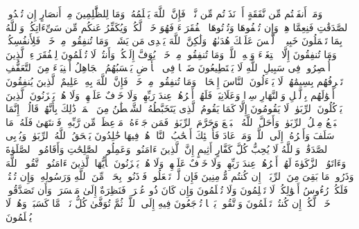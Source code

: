 \stopbuffer
\startbuffer[\q:2:270]
وَمَاۤ أَنفَقۡتُم مِّن نَّفَقَةٍ أَوۡ نَذَرۡتُم مِّن نَّذۡرࣲ فَإِنَّ ٱللَّهَ یَعۡلَمُهُۥۗ وَمَا لِلظَّٰلِمِینَ مِنۡ أَنصَارٍ%
\stopbuffer
\startbuffer[\q:2:271]
إِن تُبۡدُوا۟ ٱلصَّدَقَٰتِ فَنِعِمَّا هِیَۖ وَإِن تُخۡفُوهَا وَتُؤۡتُوهَا ٱلۡفُقَرَاۤءَ فَهُوَ خَیۡرࣱ لَّكُمۡۚ وَیُكَفِّرُ عَنكُم مِّن سَیِّءَاتِكُمۡۗ وَٱللَّهُ بِمَا تَعۡمَلُونَ خَبِیرࣱ%
\stopbuffer
\startbuffer[\q:2:272]
۞ لَّیۡسَ عَلَیۡكَ هُدَىٰهُمۡ وَلَٰكِنَّ ٱللَّهَ یَهۡدِی مَن یَشَاۤءُۗ وَمَا تُنفِقُوا۟ مِنۡ خَیۡرࣲ فَلِأَنفُسِكُمۡۚ وَمَا تُنفِقُونَ إِلَّا ٱبۡتِغَاۤءَ وَجۡهِ ٱللَّهِۚ وَمَا تُنفِقُوا۟ مِنۡ خَیۡرࣲ یُوَفَّ إِلَیۡكُمۡ وَأَنتُمۡ لَا تُظۡلَمُونَ%
\stopbuffer
\startbuffer[\q:2:273]
لِلۡفُقَرَاۤءِ ٱلَّذِینَ أُحۡصِرُوا۟ فِی سَبِیلِ ٱللَّهِ لَا یَسۡتَطِیعُونَ ضَرۡبࣰا فِی ٱلۡأَرۡضِ یَحۡسَبُهُمُ ٱلۡجَاهِلُ أَغۡنِیَاۤءَ مِنَ ٱلتَّعَفُّفِ تَعۡرِفُهُم بِسِیمَٰهُمۡ لَا یَسۡءَلُونَ ٱلنَّاسَ إِلۡحَافࣰاۗ وَمَا تُنفِقُوا۟ مِنۡ خَیۡرࣲ فَإِنَّ ٱللَّهَ بِهِۦ عَلِیمٌ%
\stopbuffer
\startbuffer[\q:2:274]
ٱلَّذِینَ یُنفِقُونَ أَمۡوَٰلَهُم بِٱلَّیۡلِ وَٱلنَّهَارِ سِرࣰّا وَعَلَانِیَةࣰ فَلَهُمۡ أَجۡرُهُمۡ عِندَ رَبِّهِمۡ وَلَا خَوۡفٌ عَلَیۡهِمۡ وَلَا هُمۡ یَحۡزَنُونَ%
\stopbuffer
\startbuffer[\q:2:275]
ٱلَّذِینَ یَأۡكُلُونَ ٱلرِّبَوٰا۟ لَا یَقُومُونَ إِلَّا كَمَا یَقُومُ ٱلَّذِی یَتَخَبَّطُهُ ٱلشَّیۡطَٰنُ مِنَ ٱلۡمَسِّۚ ذَٰلِكَ بِأَنَّهُمۡ قَالُوۤا۟ إِنَّمَا ٱلۡبَیۡعُ مِثۡلُ ٱلرِّبَوٰا۟ۗ وَأَحَلَّ ٱللَّهُ ٱلۡبَیۡعَ وَحَرَّمَ ٱلرِّبَوٰا۟ۚ فَمَن جَاۤءَهُۥ مَوۡعِظَةࣱ مِّن رَّبِّهِۦ فَٱنتَهَىٰ فَلَهُۥ مَا سَلَفَ وَأَمۡرُهُۥۤ إِلَى ٱللَّهِۖ وَمَنۡ عَادَ فَأُو۟لَٰۤئِكَ أَصۡحَٰبُ ٱلنَّارِۖ هُمۡ فِیهَا خَٰلِدُونَ%
\stopbuffer
\startbuffer[\q:2:276]
یَمۡحَقُ ٱللَّهُ ٱلرِّبَوٰا۟ وَیُرۡبِی ٱلصَّدَقَٰتِۗ وَٱللَّهُ لَا یُحِبُّ كُلَّ كَفَّارٍ أَثِیمٍ%
\stopbuffer
\startbuffer[\q:2:277]
إِنَّ ٱلَّذِینَ ءَامَنُوا۟ وَعَمِلُوا۟ ٱلصَّٰلِحَٰتِ وَأَقَامُوا۟ ٱلصَّلَوٰةَ وَءَاتَوُا۟ ٱلزَّكَوٰةَ لَهُمۡ أَجۡرُهُمۡ عِندَ رَبِّهِمۡ وَلَا خَوۡفٌ عَلَیۡهِمۡ وَلَا هُمۡ یَحۡزَنُونَ%
\stopbuffer
\startbuffer[\q:2:278]
یَٰۤأَیُّهَا ٱلَّذِینَ ءَامَنُوا۟ ٱتَّقُوا۟ ٱللَّهَ وَذَرُوا۟ مَا بَقِیَ مِنَ ٱلرِّبَوٰۤا۟ إِن كُنتُم مُّؤۡمِنِینَ%
\stopbuffer
\startbuffer[\q:2:279]
فَإِن لَّمۡ تَفۡعَلُوا۟ فَأۡذَنُوا۟ بِحَرۡبࣲ مِّنَ ٱللَّهِ وَرَسُولِهِۦۖ وَإِن تُبۡتُمۡ فَلَكُمۡ رُءُوسُ أَمۡوَٰلِكُمۡ لَا تَظۡلِمُونَ وَلَا تُظۡلَمُونَ%
\stopbuffer
\startbuffer[\q:2:280]
وَإِن كَانَ ذُو عُسۡرَةࣲ فَنَظِرَةٌ إِلَىٰ مَیۡسَرَةࣲۚ وَأَن تَصَدَّقُوا۟ خَیۡرࣱ لَّكُمۡ إِن كُنتُمۡ تَعۡلَمُونَ%
\stopbuffer
\startbuffer[\q:2:281]
وَٱتَّقُوا۟ یَوۡمࣰا تُرۡجَعُونَ فِیهِ إِلَى ٱللَّهِۖ ثُمَّ تُوَفَّىٰ كُلُّ نَفۡسࣲ مَّا كَسَبَتۡ وَهُمۡ لَا یُظۡلَمُونَ%
